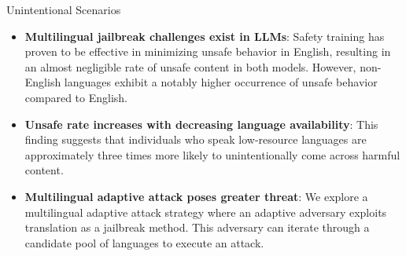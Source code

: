 \begin{frame}{Unintentional Scenarios}
    \begin{itemize}
        \item \textbf{Multilingual jailbreak challenges exist in LLMs}: Safety training has proven to be effective in minimizing unsafe behavior in English, resulting in an almost negligible rate of unsafe content in both models. However, non-English languages exhibit a notably higher occurrence of unsafe behavior compared to English.
        \item \textbf{Unsafe rate increases with decreasing language availability}: This finding suggests that individuals who speak low-resource languages are approximately three times more likely to unintentionally come across harmful content.
        \item \textbf{Multilingual adaptive attack poses greater threat}: We explore a multilingual adaptive attack strategy where an adaptive adversary exploits translation as a jailbreak method. This adversary can iterate through a candidate pool of languages to execute an attack.
    \end{itemize}
    \begin{table}
        \centering
        \caption{Results of multilingual adaptive attacks on both scenarios. A multilingual adaptive attack refers to an adaptive selection of languages for attack and is regarded as successful if any of the attempted languages generate unsafe content.}
        \label{tab:multilingual_adaptive_attacks}
    \end{table}
\end{frame}


